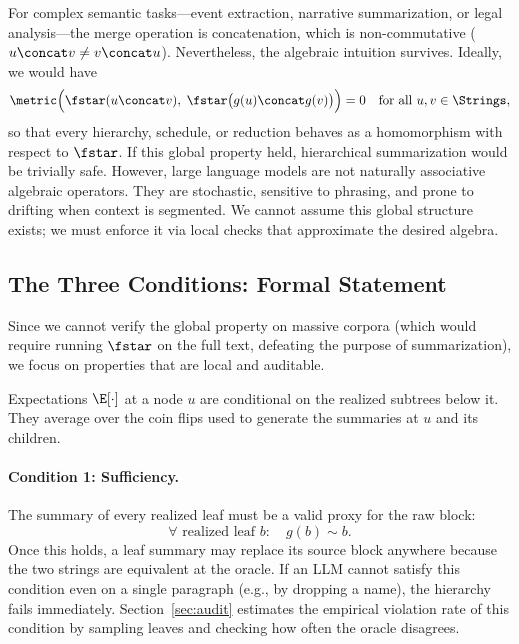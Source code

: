 For complex semantic tasks---event extraction, narrative summarization, or legal analysis---the merge operation is concatenation, which is non-commutative ($u \concat v \neq v \concat u$). Nevertheless, the algebraic intuition survives. Ideally, we would have
\[
\metric\Big(\fstar(u \concat v), \;\fstar\big(g(u) \concat g(v)\big)\Big) = 0 \quad \text{for all } u, v \in \Strings,
\]
so that every hierarchy, schedule, or reduction behaves as a homomorphism with respect to $\fstar$. If this global property held, hierarchical summarization would be trivially safe. However, large language models are not naturally associative algebraic operators. They are stochastic, sensitive to phrasing, and prone to drifting when context is segmented. We cannot assume this global structure exists; we must enforce it via local checks that approximate the desired algebra.

\subsection{The Three Conditions: Formal Statement}

Since we cannot verify the global property on massive corpora (which would require running $\fstar$ on the full text, defeating the purpose of summarization), we focus on properties that are local and auditable.

\begin{convention}
Expectations $\E[\cdot]$ at a node $u$ are conditional on the realized subtrees below it. They average over the coin flips used to generate the summaries at $u$ and its children.
\end{convention}

\paragraph{Condition 1: Sufficiency.}
The summary of every realized leaf must be a valid proxy for the raw block:
\begin{equation}\tag{C1}\label{eq:leaf_sufficiency}
\forall \text{ realized leaf } b:\quad g(b) \sim b.
\end{equation}
Once this holds, a leaf summary may replace its source block anywhere because the two strings are equivalent at the oracle. If an LLM cannot satisfy this condition even on a single paragraph (e.g., by dropping a name), the hierarchy fails immediately. Section~\ref{sec:audit} estimates the empirical violation rate of this condition by sampling leaves and checking how often the oracle disagrees.


